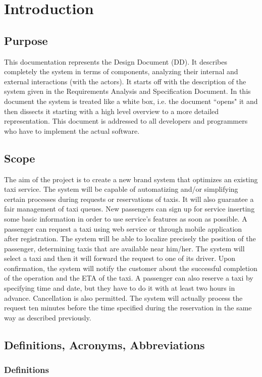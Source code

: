\section{Introduction}
\subsection{Purpose}
This documentation represents the Design Document (DD). It describes completely the system in terms of components, analyzing their internal and external interactions (with the actors). It starts off with the description of the system given in the Requirements Analysis and Specification Document. In this document the system is treated like a white box, i.e. the document ``opens" it and then dissects it starting with a high level overview to a more detailed representation. This document is addressed to all developers and programmers who have to implement the actual software.
\subsection{Scope}
The aim of the project is to create a new brand system that optimizes an 
existing taxi service.
The system will be capable of automatizing and/or simplifying certain 
processes during requests or reservations of taxis.
It will also guarantee a fair management of taxi queues.
New passengers can sign up for service inserting some basic information in order to use service's features as soon as possible.
A passenger can request a taxi using web service or through mobile
application after registration. The system will be able to localize precisely the position
of the passenger, determining taxis that are available near
him/her. The system will select a taxi and then it will forward the request to one of its driver.
Upon confirmation, the system will notify the customer about the successful completion of the operation and the ETA of the taxi. A passenger can also reserve a taxi by specifying time and date, but they have to do it with at least two hours in advance. Cancellation is also permitted. The system will actually process the request ten minutes before the time specified during the reservation in the same way as described previously.
\subsection{Definitions, Acronyms, Abbreviations}
\subsubsection{Definitions}
